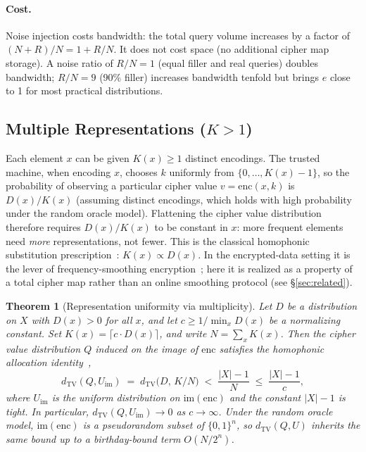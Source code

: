 \documentclass[conference]{IEEEtran}
\theoremstyle{definition}
\theoremstyle{plain}
\newtheorem{theorem}{Theorem}[section]
\theoremstyle{remark}
\newcommand{\enc}{\mathrm{enc}}
\newcommand{\TV}{d_{\mathrm{TV}}}
\newcommand{\B}{\{0,1\}}
\begin{document}
\paragraph{Cost.}
Noise injection costs bandwidth: the total query volume increases by a
factor of $(N + R) / N = 1 + R/N$.  It does not cost space (no
additional cipher map storage).  A noise ratio of $R/N = 1$ (equal
filler and real queries) doubles bandwidth; $R/N = 9$ (90\% filler)
increases bandwidth tenfold but brings $e$ close to 1 for most practical
distributions.

\subsection{Multiple Representations \texorpdfstring{($K > 1$)}{(K > 1)}}
\label{subsec:multiple-reps}

Each element $x$ can be given $K(x) \geq 1$ distinct encodings.  The
trusted machine, when encoding $x$, chooses $k$ uniformly from
$\{0, \ldots, K(x) - 1\}$, so the probability of observing a particular
cipher value $v = \enc(x, k)$ is $D(x)/K(x)$ (assuming distinct
encodings, which holds with high probability under the random oracle
model).  Flattening the cipher value distribution therefore requires
$D(x)/K(x)$ to be constant in $x$: more frequent elements need
\emph{more} representations, not fewer.  This is the classical
homophonic substitution prescription~\cite{simmons1979symmetric,
gunther1988universal,jendal1989information}: $K(x) \propto D(x)$.  In
the encrypted-data setting it is the lever of frequency-smoothing
encryption~\cite{lacharite2018frequency}; here it is realized as a
property of a total cipher map rather than an online smoothing protocol
(see \S\ref{sec:related}).

\begin{theorem}[Representation uniformity via multiplicity]
\label{thm:multiplicity}
Let $D$ be a distribution on $X$ with $D(x) > 0$ for all $x$, and let
$c \geq 1/\min_x D(x)$ be a normalizing constant.  Set
$K(x) = \lceil c \cdot D(x) \rceil$, and write $N = \sum_x K(x)$.
Then the cipher value distribution $Q$ induced on the image of $\enc$
satisfies the homophonic allocation
identity~\cite[Prop.~4.1]{towell2026cipher},
\begin{equation}
\TV(Q, U_{\mathrm{im}}) \;=\; \TV\!\bigl(D,\, K/N\bigr)
\;<\; \frac{|X| - 1}{N} \;\leq\; \frac{|X| - 1}{c},
\end{equation}
where $U_{\mathrm{im}}$ is the uniform distribution on
$\mathrm{im}(\enc)$ and the constant $|X|-1$ is tight.  In particular,
$\TV(Q, U_{\mathrm{im}}) \to 0$ as $c \to \infty$.  Under the random
oracle model, $\mathrm{im}(\enc)$ is a pseudorandom subset of $\B^n$,
so $\TV(Q, U)$ inherits the same bound up to a birthday-bound term
$O(N / 2^n)$.
\end{theorem}
\end{document}
